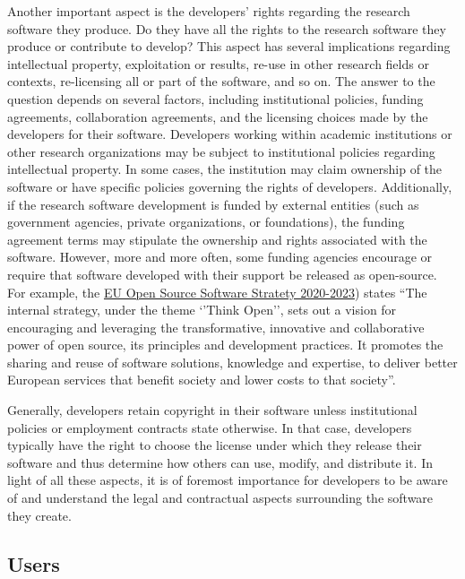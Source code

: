Another important aspect is the developers' rights regarding the research software they produce. Do they have all the rights to the research software they produce or contribute to develop? This aspect has several implications regarding intellectual property, exploitation or results, re-use in other research fields or contexts, re-licensing all or part of the software, and so on. The answer to the question depends on several factors, including institutional policies, funding agreements, collaboration agreements, and the licensing choices made by the developers for their software. Developers working within academic institutions or other research organizations may be subject to institutional policies regarding intellectual property. In some cases, the institution may claim ownership of the software or have specific policies governing the rights of developers. 
Additionally, if the research software development is funded by external entities (such as government agencies, private organizations, or foundations), the funding agreement terms may stipulate the ownership and rights associated with the software. However, more and more often, some funding agencies encourage or require that software developed with their support be released as open-source. For example, the \href{https://commission.europa.eu/about-european-commission/departments-and-executive-agencies/digital-services/open-source-software-strategy_en}{EU Open Source Software Stratety 2020-2023}) states ``The internal strategy, under the theme ‘’Think Open’’, sets out a vision for encouraging and leveraging the transformative, innovative and collaborative power of open source, its principles and development practices. It promotes the sharing and reuse of software solutions, knowledge and expertise, to deliver better European services that benefit society and lower costs to that society''.

Generally, developers retain copyright in their software unless institutional policies or employment contracts state otherwise. In that case, developers typically have the right to choose the license under which they release their software and thus determine how others can use, modify, and distribute it. 
In light of all these aspects, it is of foremost importance for developers to be aware of and understand the legal and contractual aspects surrounding the software they create. 


\subsection{Users}

